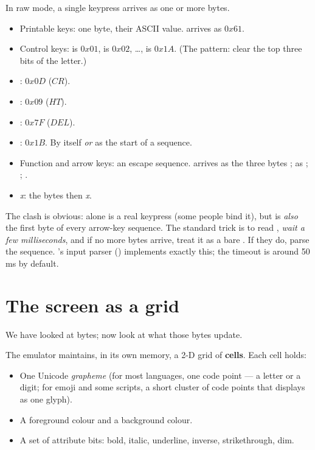 In raw mode, a single keypress arrives as one or more bytes.

\begin{itemize}[leftmargin=*]
  \item Printable keys: one byte, their ASCII value.  arrives
    as $0x61$.
  \item Control keys:  is $0x01$,  is
    $0x02$, \dots,  is $0x1A$. (The pattern: clear the
    top three bits of the letter.)
  \item {}: $0x0D$ ($CR$).
  \item {}: $0x09$ ($HT$).
  \item {}: $0x7F$ ($DEL$).
  \item {}: $0x1B$. By itself \emph{or} as the start of a
    sequence.
  \item Function and arrow keys: an escape sequence. 
    arrives as the three bytes \code{ESC [ A};  as
    \code{ESC [ B};  \code{ESC [ C}; 
    \code{ESC [ D}.
  \item {}\emph{x}: the bytes  then \emph{x}.
\end{itemize}

The clash is obvious:  alone is a real keypress (some
people bind it), but  is \emph{also} the first byte of every
arrow-key sequence. The standard trick is to read ,
\emph{wait a few milliseconds}, and if no more bytes arrive, treat it
as a bare . If they do, parse the sequence. \maya{}'s
input parser () implements exactly this;
the timeout is around 50 ms by default.

\section{The screen as a grid}

We have looked at bytes; now look at what those bytes update.

The emulator maintains, in its own memory, a 2-D grid of \textbf{cells}.
Each cell holds:

\begin{itemize}[leftmargin=*]
  \item One Unicode \emph{grapheme} (for most languages, one code
    point --- a letter or a digit; for emoji and some scripts, a
    short cluster of code points that displays as one glyph).
  \item A foreground colour and a background colour.
  \item A set of attribute bits: bold, italic, underline, inverse,
    strikethrough, dim.
\end{itemize}

